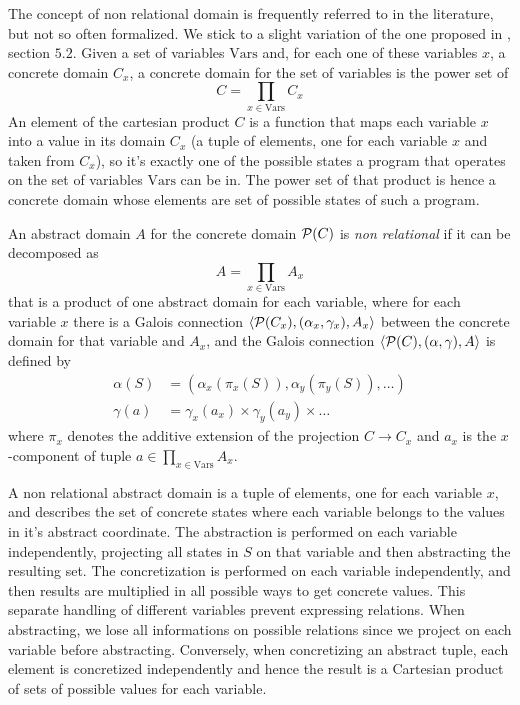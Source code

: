 The concept of non relational domain is frequently referred to in the literature, but not so often formalized. We stick to a slight variation of the one proposed in \cite{giacobazzi-analyzing-analyses}, section $5.2$.
Given a set of variables $\text{Vars}$ and, for each one of these variables $x$, a concrete domain $C_x$, a concrete domain for the set of variables is the power set of
\[
C = \prod\limits_{x \in \text{Vars}} C_x
\]
An element of the cartesian product $C$ is a function that maps each variable $x$ into a value in its domain $C_x$ (a tuple of elements, one for each variable $x$ and taken from $C_x$), so it's exactly one of the possible states a program that operates on the set of variables $\text{Vars}$ can be in. The power set of that product is hence a concrete domain whose elements are set of possible states of such a program.

\begin{definition}
	An abstract domain $A$ for the concrete domain $\mathcal{P}(C)$ is \textit{non relational} if it can be decomposed as
	\[
	A = \prod\limits_{x \in \text{Vars}} A_x
	\]
	that is a product of one abstract domain for each variable, where for each variable $x$ there is a Galois connection $\langle \mathcal{P}(C_x), (\alpha_x, \gamma_x), A_x \rangle$ between the concrete domain for that variable and $A_x$, and the Galois connection $\langle \mathcal{P}(C), (\alpha, \gamma), A \rangle$ is defined by
	\begin{align*}
		\alpha(S) &= (\alpha_x(\pi_x(S)), \alpha_y(\pi_y(S)), \dots) \\
		\gamma(a) &= \gamma_x(a_x) \times \gamma_y(a_y) \times \dots
	\end{align*}
	where $\pi_x$ denotes the additive extension of the projection $C \rightarrow C_x$ and $a_x$ is the $x$-component of tuple $a \in \prod\limits_{x \in \text{Vars}} A_x$.
\end{definition}

A non relational abstract domain is a tuple of elements, one for each variable $x$, and describes the set of concrete states where each variable belongs to the values in it's abstract coordinate. The abstraction is performed on each variable independently, projecting all states in $S$ on that variable and then abstracting the resulting set. The concretization is performed on each variable independently, and then results are multiplied in all possible ways to get concrete values.
This separate handling of different variables prevent expressing relations. When abstracting, we lose all informations on possible relations since we project on each variable before abstracting. Conversely, when concretizing an abstract tuple, each element is concretized independently and hence the result is a Cartesian product of sets of possible values for each variable.

